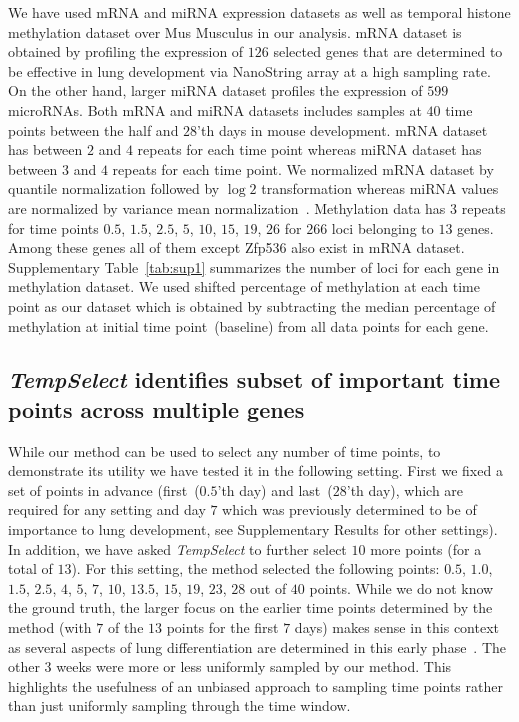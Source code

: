 \documentclass[10pt]{article}
\newcommand{\Tempselect}{\textit{TempSelect}\xspace}
\begin{document}
We have used mRNA and miRNA expression datasets as well as temporal histone
methylation dataset over Mus Musculus in our analysis. mRNA dataset is obtained by profiling the expression of $126$ selected
genes that are determined to be effective in lung development via NanoString array at a
high sampling rate. On the other hand, larger miRNA dataset
profiles the expression of $599$ microRNAs. Both mRNA and
miRNA datasets includes samples at $40$ time points between the half and
$28$'th days in mouse development. mRNA dataset has between $2$ and
$4$ repeats for each time point whereas miRNA dataset has between $3$
and $4$ repeats for each time point. We normalized mRNA dataset by
quantile normalization followed by $\log 2$ transformation whereas
miRNA values are normalized by variance mean normalization~\cite{bolstad2003}. Methylation data has $3$ repeats for time
points $0.5$, $1.5$, $2.5$, $5$, $10$, $15$, $19$, $26$ for $266$ loci
belonging to $13$ genes. Among these genes all of them except Zfp536 also exist in
mRNA dataset. Supplementary Table~\ref{tab:sup1} summarizes the number of loci for each gene in methylation
dataset. We used shifted percentage of methylation at each time
point as our dataset which is obtained by subtracting the median percentage of
methylation at initial time point~(baseline) from all data points for each gene.

\subsection{\Tempselect identifies subset of important time points across multiple genes}\label{sec:findsubset}

While our method can be used to select any number of time points, to demonstrate its utility we have tested it
in the following setting. First we fixed a set of points in advance (first~($0.5$'th day) and
last~($28$'th day), which are required for any setting and day $7$ which was
previously determined to be of importance to lung development, see
Supplementary Results for other settings). In addition, we have asked
\Tempselect to further select $10$ more points (for a total of $13$). For
this setting, the method selected the following points: $0.5$,
$1.0$, $1.5$, $2.5$, $4$, $5$, $7$, $10$, $13.5$, $15$, $19$, $23$,
$28$ out of $40$ points. While we do not know the ground truth, the larger focus on the
earlier time points determined by the method (with $7$ of the $13$
points for the first $7$ days) makes sense in this context as several
aspects of lung differentiation are determined in this early phase~\cite{guilliams2013}. The other $3$ weeks were more or less
uniformly sampled by our method. This highlights the usefulness of
an unbiased approach to sampling time points rather than just
uniformly sampling through the time window.
\end{document}
